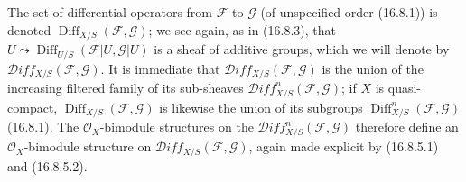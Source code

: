 \begin{env}[16.8.7]
\label{IV.16.8.7}
The set of differential operators from $\mathscr{F}$ to $\mathscr{G}$
(of unspecified order (16.8.1)) is denoted
$\operatorname{Diff}_{X/S}(\mathscr{F},\mathscr{G})$; we see again, as
in (16.8.3), that
$U\leadsto\operatorname{Diff}_{U/S}(\mathscr{F}|U,\mathscr{G}|U)$ is a
sheaf of additive groups, which we will denote by
$\mathscr{D}\!iff_{X/S}(\mathscr{F},\mathscr{G})$. It is immediate that
$\mathscr{D}\!iff_{X/S}(\mathscr{F},\mathscr{G})$ is the union of the
increasing filtered family of its sub-sheaves
$\mathscr{D}\!iff_{X/S}^n(\mathscr{F},\mathscr{G})$; if $X$ is
quasi-compact, $\operatorname{Diff}_{X/S}(\mathscr{F},\mathscr{G})$
is likewise the union of its subgroups
$\operatorname{Diff}_{X/S}^n(\mathscr{F},\mathscr{G})$ (16.8.1). The
$\mathcal{O}_X$-bimodule structures on the
$\mathscr{D}\!iff_{X/S}^n(\mathscr{F},\mathscr{G})$ therefore define an
$\mathcal{O}_X$-bimodule structure on
$\mathscr{D}\!iff_{X/S}(\mathscr{F},\mathscr{G})$, again made explicit by
(16.8.5.1) and (16.8.5.2).


\end{env}
